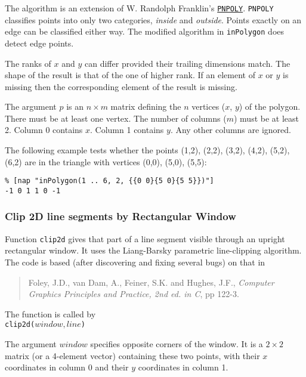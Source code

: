 The algorithm is an extension of W. Randolph Franklin's 
  \href{http://www.ecse.rpi.edu/Homepages/wrf/research/geom/pnpoly.html}
  {\texttt{PNPOLY}}. 
  \texttt{PNPOLY} classifies points into only two categories, 
  \textit{inside} and 
  \textit{outside}. Points exactly on an edge can be classified either
  way. The modified algorithm in 
  \texttt{inPolygon} does detect edge points.
  \par The ranks of 
  $x$ and 
  $y$ can differ provided their trailing dimensions match. The
  shape of the result is that of the one of higher rank. If an element
  of 
  $x$ or 
  $y$ is missing then the corresponding element of the result
  is missing.
  \par The argument 
  $p$ is an 
  $n\times  m$ matrix defining the 
  $n$ vertices ($x$, $y$) of the polygon. There must be at least one vertex. The
  number of columns ($m$) must be at least 2. Column 0 contains 
  $x$. Column 1 contains 
  $y$. Any other columns are ignored.
  \par The following example tests whether the points (1,2), (2,2),
  (3,2), (4,2), (5,2), (6,2) are in the triangle with vertices (0,0),
  (5,0), (5,5):
  \begin{verbatim}
% [nap "inPolygon(1 .. 6, 2, {{0 0}{5 0}{5 5}})"]
-1 0 1 1 0 -1
\end{verbatim}

\subsubsection{Clip 2D line segments by Rectangular Window}
    \label{function-clip2d}

Function
\texttt{clip2d}
gives that part of a line segment visible through an upright rectangular window.
It uses the Liang-Barsky parametric line-clipping algorithm.
The code is based (after discovering and fixing several bugs) on that in
\begin{quote}
Foley, J.D., van Dam, A., Feiner, S.K. and Hughes, J.F.,
\emph{Computer Graphics Principles and Practice, 2nd ed. in C},
pp 122-3.
\end{quote}

The function is called by 
\\
\texttt{clip2d(}$\mathit{window, line}$\texttt{)} 

The argument $\mathit{window}$ specifies opposite corners of the window.
It is a $2 \times 2$ matrix (or a 4-element vector) containing these two points,
with their $x$ coordinates in column 0
and their $y$ coordinates in column 1.

